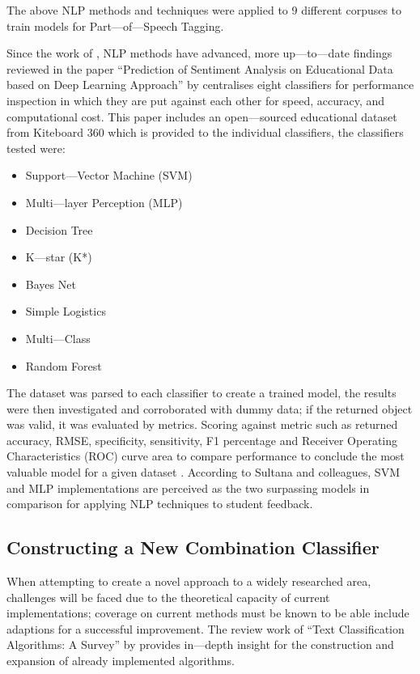 The above NLP methods and techniques were applied to 9 different corpuses to train models for Part---of---Speech Tagging.

Since the work of \textcite{enriquez2013comparative}, NLP methods have advanced, more up---to---date findings reviewed in the paper “Prediction of Sentiment Analysis on Educational Data based on Deep Learning Approach” by \parencite{sultana2018prediction} centralises eight classifiers for performance inspection in which they are put against each other for speed, accuracy, and computational cost. This paper includes an open---sourced educational dataset from Kiteboard 360 which is provided to the individual classifiers, the classifiers tested were:

\begin{itemize}
    \item Support---Vector Machine (SVM)
    \item Multi---layer Perception (MLP)
    \item Decision Tree
    \item K---star (K*)
    \item Bayes Net
    \item Simple Logistics
    \item Multi---Class
    \item Random Forest
\end{itemize}

The dataset was parsed to each classifier to create a trained model, the results were then investigated and corroborated with dummy data; if the returned object was valid, it was evaluated by metrics. Scoring against metric such as returned accuracy, RMSE, specificity, sensitivity, F1 percentage and Receiver Operating Characteristics (ROC) curve area to compare performance to conclude the most valuable model for a given dataset \parencite{sultana2018prediction}. According to Sultana and colleagues, SVM and MLP implementations are perceived as the two surpassing models in comparison for applying NLP techniques to student feedback.

\subsection{Constructing a New Combination Classifier}

When attempting to create a novel approach to a widely researched area, challenges will be faced due to the theoretical capacity of current implementations; coverage on current methods must be known to be able include adaptions for a successful improvement. The review work of “Text Classification Algorithms: A Survey” by \parencite{kowsari2019text} provides in---depth insight for the construction and expansion of already implemented algorithms.


